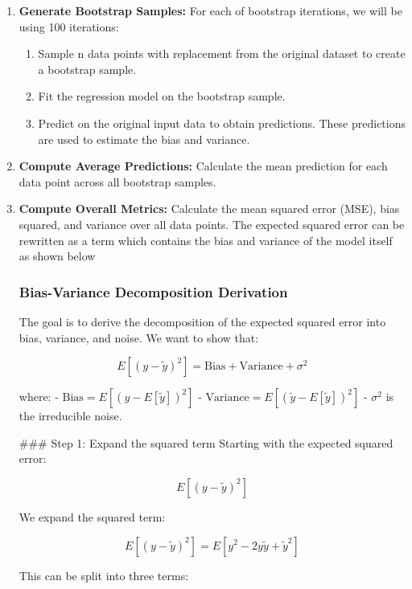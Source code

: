 \documentclass{article}
\begin{document}
\begin{enumerate} 
\item \textbf{Generate Bootstrap Samples:}
For each of bootstrap iterations, we will be using 100 iterations: 
                    \begin{enumerate} 
                     \item Sample n data points with replacement from the original           dataset to create a bootstrap sample. 
                     \item Fit the regression model on the bootstrap sample. 
                     \item Predict on the original input data to obtain predictions. These predictions are used to estimate the bias and variance.
                    \end{enumerate}
                        
\item \textbf{Compute Average Predictions:}
Calculate the mean prediction for each data point across all bootstrap samples.

\item \textbf{Compute Overall Metrics:} Calculate the mean squared error (MSE), bias squared, and variance over all data points. The expected squared error can be rewritten as a term which contains the bias and variance of the model itself as shown below


\subsubsection{Bias-Variance Decomposition Derivation \cite{Elements_statistical_learning} }

The goal is to derive the decomposition of the expected squared error into bias, variance, and noise. We want to show that:

\[
E[(y - \tilde{y})^2] = \text{Bias} + \text{Variance} + \sigma^2
\]

where:
- $\text{Bias} = E[(y - E[\tilde{y}])^2]$
- $\text{Variance} = E[(\tilde{y} - E[\tilde{y}])^2]$
- $\sigma^2$ is the irreducible noise.

### Step 1: Expand the squared term
Starting with the expected squared error:

\[
E[(y - \tilde{y})^2]
\]

We expand the squared term:

\[
E[(y - \tilde{y})^2] = E[y^2 - 2y\tilde{y} + \tilde{y}^2]
\]

This can be split into three terms:


\end{enumerate}
\end{document}
